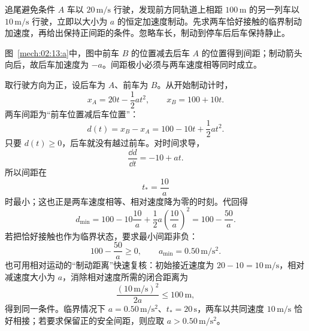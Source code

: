 {\begin{origexamplebox}{追尾避免条件}\label{ch02:ex:k02-2-13}
$A$ 车以 $20\,\mathrm{m/s}$ 行驶，发现前方同轨道上相距 $100\,\mathrm m$ 的另一列车以 $10\,\mathrm{m/s}$ 行驶，立即以大小为 $a$ 的恒定加速度制动。先求两车恰好接触的临界制动加速度，再给出保持正间距的条件。忽略车长，制动到停车后后车保持静止。

\begin{qualityfigure}
\label{mech:02:13:q}
\end{qualityfigure}
\end{origexamplebox}
\begin{xesolution}
\begin{qualityfigure}
\label{mech:02:13:a}
\end{qualityfigure}
图~\ref{mech:02:13:a}中，图中前车 $B$ 的位置减去后车 $A$ 的位置得到间距；制动箭头向后，故后车加速度为 $-a$。间距极小必须与两车速度相等同时成立。

取行驶方向为正，设后车为 $A$、前车为 $B$。从开始制动计时，
\[
x_A=20t-\frac12at^2,
\qquad
x_B=100+10t.
\]
两车间距为“前车位置减后车位置”：
\[
d(t)=x_B-x_A=100-10t+\frac12at^2.
\]
只要 $d(t)\ge0$，后车就没有越过前车。对时间求导，
\[
\frac{\dd d}{\dd t}=-10+at.
\]
所以间距在
\[
t_*=\frac{10}{a}
\]
时最小；这也正是两车速度相等、相对速度降为零的时刻。代回得
\[
d_{\min}=100-10\frac{10}{a}
+\frac12a\left(\frac{10}{a}\right)^2
=100-\frac{50}{a}.
\]
若把恰好接触也作为临界状态，要求最小间距非负：
\[
100-\frac{50}{a}\ge0,\qquad \boxed{a_{\min}=0.50\,\mathrm{m/s^2}}.
\]
也可用相对运动的“制动距离”快速复核：初始接近速度为
$20-10=10\,\mathrm{m/s}$，相对减速度大小为 $a$，消除相对速度所需的闭合距离为
\[
\frac{(10\,\mathrm{m/s})^2}{2a}\le100\,\mathrm m,
\]
得到同一条件。临界情况下 $a=0.50\,\mathrm{m/s^2}$、$t_*=20\,\mathrm s$，两车以共同速度 $10\,\mathrm{m/s}$ 恰好相接；若要求保留正的安全间距，则应取 $a>0.50\,\mathrm{m/s^2}$。
\end{xesolution}

}
